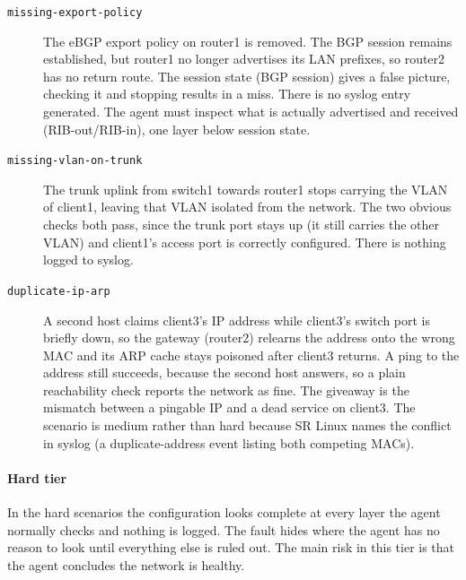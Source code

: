 \begin{description}
    \item[\texttt{missing-export-policy}] The eBGP export policy on router1 is removed.
          The BGP session remains established, but router1 no longer advertises
          its LAN prefixes, so router2 has no return route. The session state (BGP session) gives a false picture,
          checking it and stopping results in a miss. There is no syslog entry generated. The agent must inspect
          what is actually advertised and received (RIB-out/RIB-in), one layer below session state.
    \item[\texttt{missing-vlan-on-trunk}] The trunk uplink from switch1 towards
          router1 stops carrying the VLAN of client1, leaving that VLAN isolated from the network. The two obvious checks both pass, since the trunk port stays up (it still
          carries the other VLAN) and client1's access port is correctly configured.
          There is nothing logged to syslog.
    \item[\texttt{duplicate-ip-arp}] A second host claims client3's IP address while
          client3's switch port is briefly down, so the gateway (router2) relearns
          the address onto the wrong MAC and its ARP cache stays poisoned after
          client3 returns. A ping to the address still succeeds, because the second host
          answers, so a plain reachability check reports the network as fine. The giveaway is the
          mismatch between a pingable IP and a dead service on client3. The scenario is
          medium rather than hard because SR Linux names the conflict in syslog (a duplicate-address
          event listing both competing MACs).
\end{description}

\paragraph{Hard tier}
In the hard scenarios the configuration looks complete at every layer the agent normally checks
and nothing is logged. The fault hides where the agent has no reason to look until everything
else is ruled out. The main risk in this tier is that the agent concludes the network is
healthy.

